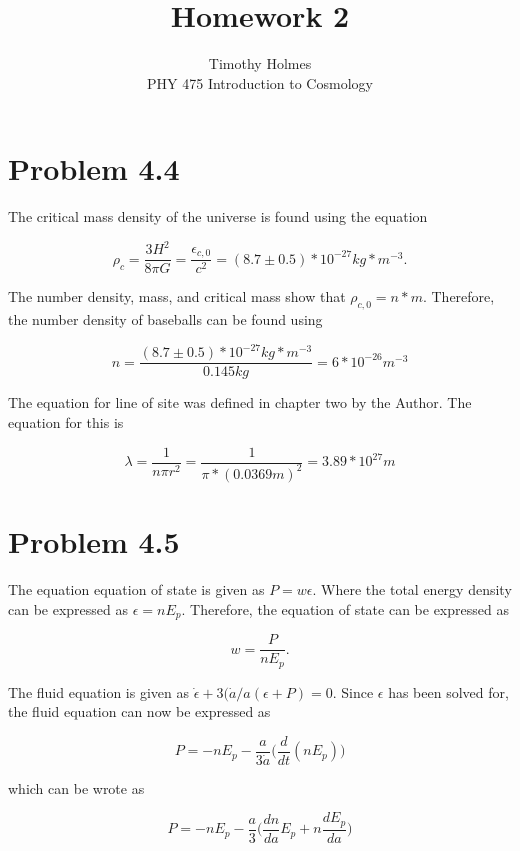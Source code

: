 \documentclass[12pt]{article}
\begin{document}
 
 
\title{Homework 2}
\author{Timothy Holmes\\ %
PHY 475 Introduction to Cosmology}

\maketitle

\section*{Problem 4.4}

The critical mass density of the universe is found using the equation

$$
\rho_{c} = \frac{3H^{2}}{8\pi G} = \frac{\epsilon_{c,0}}{c^2} = (8.7 \pm 0.5)*10^{-27} kg*m^{-3}.
$$

The number density, mass, and critical mass show that $\rho_{c,0} = n*m$. Therefore, the number density of baseballs can be found using

$$
n = \frac{(8.7 \pm 0.5)*10^{-27} kg*m^{-3}}{0.145 kg} = 6*10^{-26}m^{-3}
$$

The equation for line of site was defined in chapter two by the Author. The equation for this is 

$$
\lambda = \frac{1}{n\pi r^2} = \frac{1}{\pi * (0.0369 m)^{2}} = 3.89*10^{27}m
$$

\section*{Problem 4.5}

The equation equation of state is given as $P = w\epsilon$. Where the total energy density can be expressed as $\epsilon = n E_{p}$. Therefore, the equation of state can be expressed as

$$
w = \frac{P}{nE_{p}}.
$$

The fluid equation is given as $\dot{\epsilon} + 3(\dot{a}/a(\epsilon + P) = 0$. Since $\epsilon$ has been solved for, the fluid equation can now be expressed as 

$$
P = -nE_{p} - \frac{a}{3\dot{a}}\Big(\frac{d}{dt}(nE_{p})\Big)
$$

which can be wrote as

$$
P = -nE_{p} - \frac{a}{3}\Big(\frac{dn}{da}E_{p} + n\frac{dE_{p}}{da}\Big)
$$
\end{document}
